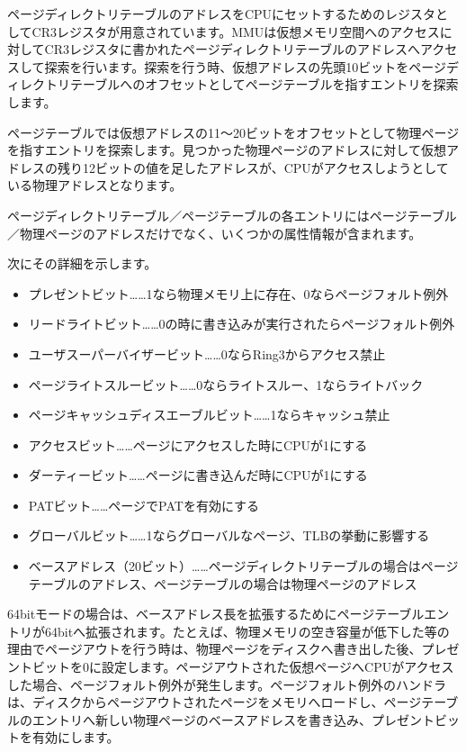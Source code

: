 \documentclass[a4j,12pt]{jarticle}
\begin{document}
ページディレクトリテーブルのアドレスをCPUにセットするためのレジスタとしてCR3レジスタが用意されています。MMUは仮想メモリ空間へのアクセスに対してCR3レジスタに書かれたページディレクトリテーブルのアドレスへアクセスして探索を行います。探索を行う時、仮想アドレスの先頭10ビットをページディレクトリテーブルへのオフセットとしてページテーブルを指すエントリを探索します。

ページテーブルでは仮想アドレスの11～20ビットをオフセットとして物理ページを指すエントリを探索します。見つかった物理ページのアドレスに対して仮想アドレスの残り12ビットの値を足したアドレスが、CPUがアクセスしようとしている物理アドレスとなります。

ページディレクトリテーブル／ページテーブルの各エントリにはページテーブル／物理ページのアドレスだけでなく、いくつかの属性情報が含まれます。

次にその詳細を示します。

\begin{itemize}
 \item プレゼントビット……1なら物理メモリ上に存在、0ならページフォルト例外
 \item リードライトビット……0の時に書き込みが実行されたらページフォルト例外
 \item ユーザスーパーバイザービット……0ならRing3からアクセス禁止
 \item ページライトスルービット……0ならライトスルー、1ならライトバック
 \item ページキャッシュディスエーブルビット……1ならキャッシュ禁止
 \item アクセスビット……ページにアクセスした時にCPUが1にする
 \item ダーティービット……ページに書き込んだ時にCPUが1にする
 \item PATビット……ページでPATを有効にする
 \item グローバルビット……1ならグローバルなページ、TLBの挙動に影響する
 \item ベースアドレス（20ビット）……ページディレクトリテーブルの場合はページテーブルのアドレス、ページテーブルの場合は物理ページのアドレス
\end{itemize}

64bitモードの場合は、ベースアドレス長を拡張するためにページテーブルエントリが64bitへ拡張されます。たとえば、物理メモリの空き容量が低下した等の理由でページアウトを行う時は、物理ページをディスクへ書き出した後、プレゼントビットを0に設定します。ページアウトされた仮想ページへCPUがアクセスした場合、ページフォルト例外が発生します。ページフォルト例外のハンドラは、ディスクからページアウトされたページをメモリへロードし、ページテーブルのエントリへ新しい物理ページのベースアドレスを書き込み、プレゼントビットを有効にします。
\end{document}
